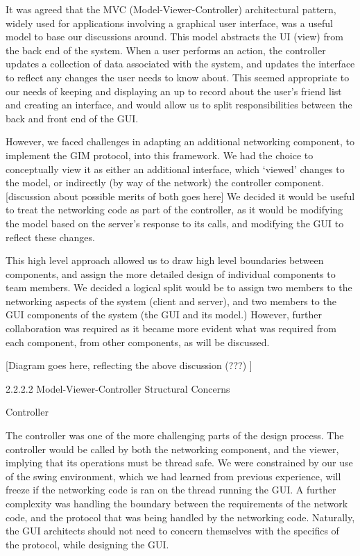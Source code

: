 It was agreed that the MVC (Model-Viewer-Controller) architectural pattern, widely used for applications involving a graphical user interface, was a useful model to base our discussions around. This model abstracts the UI (view) from the back end of the system. When a user performs an action, the controller updates a collection of data associated with the system, and updates the interface to reflect any changes the user needs to know about. This seemed appropriate to our needs of keeping and displaying an up to record about the user’s friend list and creating an interface, and would allow us to split responsibilities between the back and front end of the GUI. 

However, we faced challenges in adapting an additional networking component, to implement the GIM protocol, into this framework. We had the choice to conceptually view it as either an additional interface, which ‘viewed’ changes to the model, or indirectly (by way of the network) the controller component. [discussion about possible merits of both goes here] We decided it would be useful to treat the networking code as part of the controller, as it would be modifying the model based on the server’s response to its calls, and modifying the GUI to reflect these changes.
	
This high level approach allowed us to draw high level boundaries between components, and assign the more detailed design of individual components to team members. We decided a logical split would be to assign two members to the networking aspects of the system (client and server), and two members to the GUI components of the system (the GUI and its model.) However, further collaboration was required as it became more evident what was required from each component, from other components, as will be discussed. 

[Diagram goes here, reflecting the above discussion (???) ]

2.2.2.2 Model-Viewer-Controller Structural Concerns

Controller

The controller was one of the more challenging parts of the design process. The controller would be called by both the networking component, and the viewer, implying that its operations must be thread safe. We were constrained by our use of the swing environment, which we had learned from previous experience, will freeze if the networking code is ran on the thread running the GUI. A further complexity was handling the boundary between the requirements of the network code, and the protocol that was being handled by the networking code. Naturally, the GUI architects should not need to concern themselves with the specifics of the protocol, while designing the GUI. 

